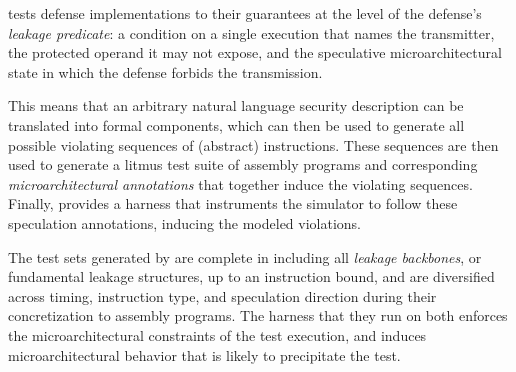 {}

\toolname{} tests defense implementations to their guarantees at the level of the defense's \emph{leakage predicate}: a condition on a single execution that names the transmitter, the protected operand it may not expose, and the speculative microarchitectural state in which the defense forbids the transmission. 

This means that an arbitrary natural language security description can be translated into formal components, which can then be used to generate all possible violating sequences of (abstract) instructions. These sequences are then used to generate a litmus test suite of assembly programs and corresponding \textit{microarchitectural annotations} that together induce the violating sequences. Finally, \toolname provides a harness that instruments the simulator to follow these speculation annotations, inducing the modeled violations.

The test sets generated by \toolname are complete in including all  \textit{leakage backbones}, or fundamental leakage structures, up to an instruction bound, and are diversified across timing, instruction type, and speculation direction during their concretization to assembly programs. 
\urgentbr
{}
\notebr
The harness that they run on both enforces the microarchitectural constraints of the test execution, and induces microarchitectural behavior that is likely to precipitate the test. 

